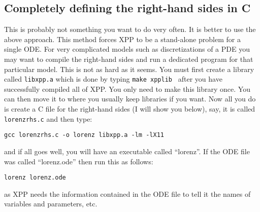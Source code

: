 \documentclass{article}
\begin{document}
\subsection{Completely defining the right-hand sides in C} 

This is probably not something you want to do very often. It is better
to use the above approach.  This method forces XPP to be a stand-alone problem for a single ODE.
For very complicated models such as discretizations of a PDE
you may want to compile the right-hand sides and run a dedicated
program for that particular model.  This is not as hard as it
seems. You must first create a library called  {\tt libxpp.a} which is
done by typing  {\tt make xpplib } after you have successfully
compiled all of XPP.  You only need to make this library once. You can
then move it to where you usually keep libraries if you want.  Now all
you do is create a C file for the right-hand sides (I will show you
below), say, it is called {\tt lorenzrhs.c} and then type:
\begin{verbatim}
gcc lorenzrhs.c -o lorenz libxpp.a -lm -lX11 
\end{verbatim}
and if all goes well, you will have an executable called ``lorenz''.
If the ODE file was called ``lorenz.ode'' then run this as follows:
\begin{verbatim}
lorenz lorenz.ode
\end{verbatim}
as XPP needs the information contained in the ODE file to tell it the
names of variables and parameters, etc.  
\end{document}
